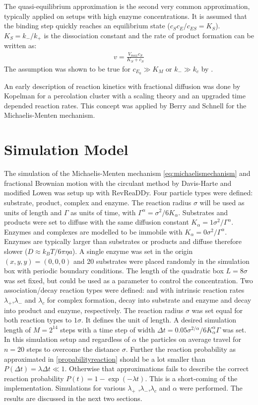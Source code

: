 \documentclass[
  a4paper,BCOR10mm,twoside,
  headsepline,footsepline,%
  fleqn,openbib
]{scrbook}
\begin{document}
The quasi-equilibrium approximation is the second very common approximation, typically applied on setups with high enzyme concentrations. It is assumed that the binding step quickly reaches an equilibrium state ($c_S c_E/c_{ES}=K_S$). $K_S=k_-/k_+$ is the dissociation constant and the rate of product formation can be written as:
\begin{align}
 v={\frac{V_{max} c_S}{K_S+ c_S}}
\end{align}
The assumption was shown to be true for $c_{E_0}\gg K_M \text{ or } k_- \gg k_c$ by \citet{Palsson1987}.\par  An early description of reaction kinetics with fractional diffusion was done by Kopelman \cite{Kopelman1988} for a percolation cluster with a scaling theory and an upgraded time depended reaction rates. This concept was applied by Berry \cite{Berry2002} and Schnell \cite{Schnell2004} for the Michaelis-Menten mechanism.
\section{Simulation Model}
The simulation of the Michaelis-Menten mechanism \cref{eq:michaelismechanism} and fractional Brownian motion with the circulant method by Davis-Harte \cite{Dieker2004} and modified Lowen was setup up with RevReaDDy. Four particle types were defined: substrate, product, complex and enzyme. The reaction radius $\sigma$ will be used as units of length and  $\Gamma$ as units of time, with $\Gamma^{\alpha}=\sigma^2/6 K_{\alpha} $.   Substrates and products were set to diffuse with the same diffusion constant $K_{\alpha}=1 \sigma^2 / \Gamma^{\alpha} $. Enzymes and complexes are modelled to be immobile with $K_{\alpha}= 0 \sigma^2 / \Gamma^{\alpha} $. Enzymes are typically larger than substrates or products and diffuse therefore slower ($D\approx k_B T/6 \pi \eta a$).  A single enzyme was set in the origin $(x,y,y)=(0,0,0)$ and 20 substrates were placed randomly in the simulation box with periodic boundary conditions. The length of the quadratic box $L=8 \sigma$ was set fixed, but could be used as a parameter to control the concentration. Two association/decay reaction types were defined:   and  with intrinsic reaction rates $\lambda_+$,$\lambda_-$ and $\lambda_c$ for complex formation, decay into substrate and enzyme and decay into product and enzyme, respectively. The reaction radius $\sigma$ was set equal for both reaction types to  $1 \sigma$. It defines the unit of length. A desired simulation length of $M=2^{14}$ steps with a time step of width $\Delta t=0.05 \sigma^{2/\alpha}/6 K_{\alpha}^{\alpha} \Gamma $ was set. In this simulation setup and regardless of $\alpha$ the particles on average travel for $n=20$ steps to overcome the distance $\sigma$. Further the reaction probability  as approximated in \cref{propabilityreaction} should be a lot smaller than  $P(\Delta t)=\lambda \Delta t \ll 1$. Otherwise that approximations fails to describe the correct reaction probability $P(t)=1-\exp(-\lambda t)$. This is a short-coming of the implementation. Simulations for various $\lambda_+$ ,$\lambda_-$,$\lambda_c$ and $\alpha$ were performed. The results are discussed in the next two sections. 
\end{document}
